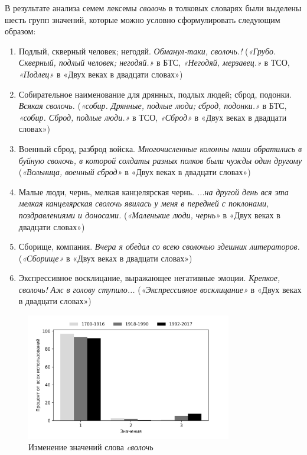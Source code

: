 В результате анализа семем лексемы \textit{сволочь} в толковых словарях были выделены шесть групп значений,
которые можно условно сформулировать следующим образом:

\begin{enumerate}
    \item Подлый, скверный человек; негодяй. \textit{Обманул-таки, сволочь.!}
(\textit{«Грубо. Скверный, подлый человек; негодяй.»} в БТС,
\textit{«Негодяй, мерзавец.»} в ТСО,
\textit{«Подлец»} в «Двух веках в двадцати словах»)

    \item Собирательное наименование для дрянных, подлых людей; сброд, подонки. \textit{Всякая сволочь.}
(\textit{«собир. Дрянные, подлые люди; сброд, подонки.»} в БТС,
\textit{«собир. Сброд, подлые люди.»} в ТСО,
\textit{«Сброд»} в «Двух веках в двадцати словах»)

    \item Военный сброд, разброд войска. \textit{Многочисленные колонны наши обратились в буйную сволочь, в которой солдаты разных полков были чужды один другому}
(\textit{«Вольница, военный сброд»} в «Двух веках в двадцати словах»)

    \item Малые люди, чернь, мелкая канцелярская чернь. \textit{...на другой день вся эта мелкая канцелярская сволочь явилась у меня в передней с поклонами, поздравлениями и доносами.}
(\textit{«Маленькие люди, чернь»} в «Двух веках в двадцати словах»)

    \item Сборище, компания. \textit{Вчера я обедал со всею сволочью здешних литераторов.}
(\textit{«Сборище»} в «Двух веках в двадцати словах»)

    \item Экспрессивное восклицание, выражающее негативные эмоции. \textit{Крепкое, сволочь! Аж в голову ступило...}
(\textit{«Экспрессивное восклицание»} в «Двух веках в двадцати словах»)
\end{enumerate}

\begin{figure}[H]
	\centering
	\includegraphics[width=0.8\textwidth]{img/visualizations/svoloch'_minimal}
	\caption{Изменение значений слова \textit{cволочь}}
	\label{fig:Сволочь}
\end{figure}

